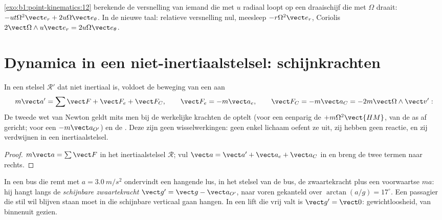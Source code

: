 \begin{example}\label{ex:b1:non-inertial-frames:turntable}
\cref{exo:b1:point-kinematics:12} berekende de versnelling van iemand die
met $u$ radiaal loopt op een draaischijf die met $\Omega$ draait: $-ut\Omega^2\vect e_r
+ 2u\Omega\vect e_\theta$. In de nieuwe taal: relatieve versnelling nul,
meesleep $-r\Omega^2\vect e_r$, Coriolis $2\vect\Omega\wedge u\vect e_r = 2u\Omega\vect e_\theta$.
\end{example}

\section{Dynamica in een niet-inertiaalstelsel: schijnkrachten}

\begin{theorem}\label{thm:b1:non-inertial-frames:dynamics}
In een stelsel $\mathcal R'$ dat niet inertiaal is, voldoet de beweging van een
 aan
\[
m\vect a' = \sum\vect F + \vect F_e + \vect F_C, \qquad
\vect F_e = -m\vect a_e, \qquad \vect F_C = -m\vect a_C = -2m\vect\Omega\wedge\vect v' :
\]
De tweede wet van Newton geldt mits men bij de werkelijke krachten de
\emph{} optelt (voor een eenparig  de
\emph{} $+m\Omega^2\vect{HM}$, van de as af
gericht; voor een  $-m\vect a_{O'}$) en de
\emph{}. Deze \emph{} zijn geen wisselwerkingen: geen
enkel lichaam oefent ze uit, zij hebben geen reactie, en zij verdwijnen in een
inertiaalstelsel.
\end{theorem}

\begin{proof}
$m\vect a = \sum\vect F$ in het inertiaalstelsel $\mathcal R$; vul
$\vect a = \vect a' + \vect a_e + \vect a_C$ in en breng de twee termen naar
rechts.
\end{proof}

\begin{example}\label{ex:b1:non-inertial-frames:bus}
In een bus die remt met $a = \qty{3.0}{m/s^2}$ ondervindt een hangende lus, in
het stelsel van de bus, de zwaartekracht plus een voorwaartse  $ma$: hij hangt
langs de \emph{schijnbare zwaartekracht} $\vect g' = \vect g - \vect a_{O'}$, naar
voren gekanteld over $\arctan(a/g) = 17^\circ$. Een passagier die stil wil
blijven staan moet in die schijnbare verticaal gaan hangen. In een lift die vrij
valt is $\vect g' = \vect 0$: gewichtloosheid, van binnenuit gezien.
\end{example}

